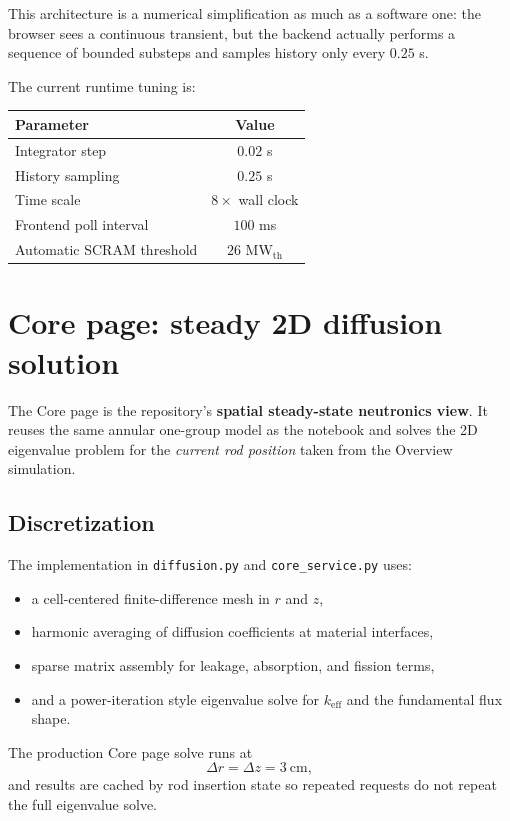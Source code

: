 \documentclass[11pt]{article}
\begin{document}
This architecture is a numerical simplification as much as a software one: the
browser sees a continuous transient, but the backend actually performs a sequence
of bounded substeps and samples history only every $0.25$ s.

The current runtime tuning is:
\begin{center}
\begin{tabular}{lc}
\toprule
Parameter & Value \\
\midrule
Integrator step & $0.02$ s \\
History sampling & $0.25$ s \\
Time scale & $8\times$ wall clock \\
Frontend poll interval & $100$ ms \\
Automatic SCRAM threshold & $26$ MW$_{\mathrm{th}}$ \\
\bottomrule
\end{tabular}
\end{center}

\section{Core page: steady 2D diffusion solution}

The Core page is the repository's \textbf{spatial steady-state neutronics view}.
It reuses the same annular one-group model as the notebook and solves the 2D
eigenvalue problem for the \emph{current rod position} taken from the Overview
simulation.

\subsection{Discretization}

The implementation in \texttt{diffusion.py} and \texttt{core\_service.py} uses:
\begin{itemize}
  \item a cell-centered finite-difference mesh in $r$ and $z$,
  \item harmonic averaging of diffusion coefficients at material interfaces,
  \item sparse matrix assembly for leakage, absorption, and fission terms,
  \item and a power-iteration style eigenvalue solve for $k_{\mathrm{eff}}$ and
        the fundamental flux shape.
\end{itemize}

The production Core page solve runs at
\[
\Delta r = \Delta z = 3\ \mathrm{cm},
\]
and results are cached by rod insertion state so repeated requests do not repeat
the full eigenvalue solve.
\end{document}

